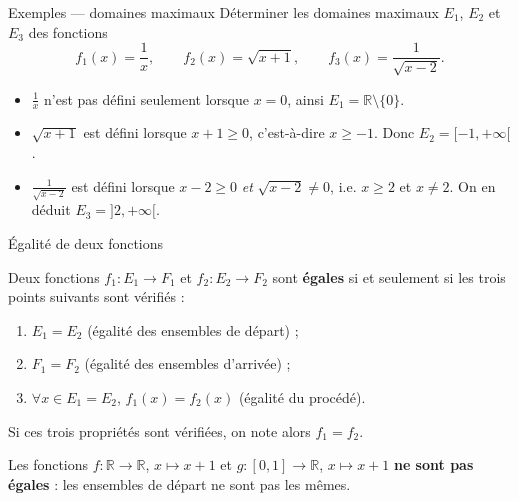 \documentclass[aspectratio=169,11pt]{beamer}
\newcommand{\R}{\mathbb{R}}
\newcommand{\key}[1]{\textbf{\color{DarkBlue}#1}}
\newcommand{\important}[1]{\textbf{\color{DarkRed}#1}}
\newcommand{\fonc}[3]{#1\colon #2\to #3}
\begin{document}
\begin{frame}{Exemples --- domaines maximaux}
	Déterminer les domaines maximaux $E_1$, $E_2$ et $E_3$ des fonctions
	\[
		f_1(x)=\frac{1}{x},\qquad
		f_2(x)=\sqrt{x+1},\qquad
		f_3(x)=\frac{1}{\sqrt{x-2}}.
	\]
	\vspace{0.1cm}
	\begin{exemplebox}[Correction]
		\begin{itemize}
			\item $\frac{1}{x}$ n'est pas défini seulement lorsque $x=0$, ainsi
			$E_1=\R\setminus\{0\}$.
			\item $\sqrt{x+1}$ est défini lorsque $x+1\ge 0$, c'est-à-dire $x\ge -1$.
			Donc $E_2=[-1,+\infty[$.
			\item $\frac{1}{\sqrt{x-2}}$ est défini lorsque $x-2\ge 0$ \emph{et}
			$\sqrt{x-2}\neq 0$, i.e. $x\ge 2$ et $x\neq 2$.
			On en déduit $E_3=]2,+\infty[$.
		\end{itemize}
	\end{exemplebox}
\end{frame}

\begin{frame}{Égalité de deux fonctions}
	\begin{definitionbox}[Proposition 2.1]
		Deux fonctions $\fonc{f_1}{E_1}{F_1}$ et $\fonc{f_2}{E_2}{F_2}$ sont
		\key{égales} si et seulement si les trois points suivants sont vérifiés :
		\begin{enumerate}
			\item $E_1=E_2$ (égalité des ensembles de départ) ;
			\item $F_1=F_2$ (égalité des ensembles d'arrivée) ;
			\item $\forall x\in E_1=E_2$, $f_1(x)=f_2(x)$ (égalité du procédé).
		\end{enumerate}
		Si ces trois propriétés sont vérifiées, on note alors $f_1=f_2$.
	\end{definitionbox}
	\vspace{0.15cm}
	\begin{exemplebox}
		Les fonctions
		$\fonc{f}{\R}{\R}$, $x\longmapsto x+1$
		et
		$\fonc{g}{[0,1]}{\R}$, $x\longmapsto x+1$
		\important{ne sont pas égales} : les ensembles de départ ne sont pas les mêmes.
	\end{exemplebox}
\end{frame}
\end{document}
